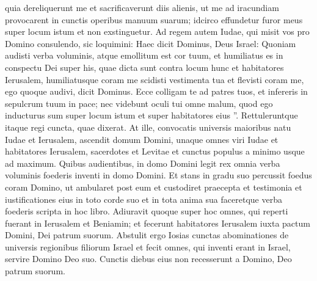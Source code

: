 \begin{biblechapter}
\begin{biblechapter}
\begin{biblechapter}
\begin{biblechapter}
\begin{biblechapter}
\begin{biblechapter}
\begin{biblechapter}
\begin{biblechapter}
\begin{biblechapter}
\begin{biblechapter}
\begin{biblechapter}
\begin{biblechapter}
\begin{biblechapter}
\begin{biblechapter}
\begin{biblechapter}
\begin{biblechapter}
\begin{biblechapter}
\begin{biblechapter}
\begin{biblechapter}
\begin{biblechapter}
\begin{biblechapter}
\begin{biblechapter}
\begin{biblechapter}
\begin{biblechapter}
\begin{biblechapter}
\begin{biblechapter}
\begin{biblechapter}
\begin{biblechapter}
\begin{biblechapter}
\begin{biblechapter}
\begin{biblechapter}
\begin{biblechapter}
\begin{biblechapter}
\begin{biblechapter}
\verse quia dereliquerunt me et sacrificaverunt diis alienis, ut me ad iracundiam provocarent in cunctis operibus manuum suarum; idcirco effundetur furor meus super locum istum et non exstinguetur. 
\verse Ad regem autem Iudae, qui misit vos pro Domino consulendo, sic loquimini: Haec dicit Dominus, Deus Israel: Quoniam audisti verba voluminis, 
\verse atque emollitum est cor tuum, et humiliatus es in conspectu Dei super his, quae dicta sunt contra locum hunc et habitatores Ierusalem, humiliatusque coram me scidisti vestimenta tua et flevisti coram me, ego quoque audivi, dicit Dominus. 
\verse Ecce colligam te ad patres tuos, et infereris in sepulcrum tuum in pace; nec videbunt oculi tui omne malum, quod ego inducturus sum super locum istum et super habitatores eius ”.
 Rettuleruntque itaque regi cuncta, quae dixerat.
 \verse At ille, convocatis universis maioribus natu Iudae et Ierusalem, 
\verse ascendit domum Domini, unaque omnes viri Iudae et habitatores Ierusalem, sacerdotes et Levitae et cunctus populus a minimo usque ad maximum. Quibus audientibus, in domo Domini legit rex omnia verba voluminis foederis inventi in domo Domini. 
\verse Et stans in gradu suo percussit foedus coram Domino, ut ambularet post eum et custodiret praecepta et testimonia et iustificationes eius in toto corde suo et in tota anima sua faceretque verba foederis scripta in hoc libro. 
\verse Adiuravit quoque super hoc omnes, qui reperti fuerant in Ierusalem et Beniamin; et fecerunt habitatores Ierusalem iuxta pactum Domini, Dei patrum suorum. 
\verse Abstulit ergo Iosias cunctas abominationes de universis regionibus filiorum Israel et fecit omnes, qui inventi erant in Israel, servire Domino Deo suo. Cunctis diebus eius non recesserunt a Domino, Deo patrum suorum.
 

\end{biblechapter}
\end{biblechapter}
\end{biblechapter}
\end{biblechapter}
\end{biblechapter}
\end{biblechapter}
\end{biblechapter}
\end{biblechapter}
\end{biblechapter}
\end{biblechapter}
\end{biblechapter}
\end{biblechapter}
\end{biblechapter}
\end{biblechapter}
\end{biblechapter}
\end{biblechapter}
\end{biblechapter}
\end{biblechapter}
\end{biblechapter}
\end{biblechapter}
\end{biblechapter}
\end{biblechapter}
\end{biblechapter}
\end{biblechapter}
\end{biblechapter}
\end{biblechapter}
\end{biblechapter}
\end{biblechapter}
\end{biblechapter}
\end{biblechapter}
\end{biblechapter}
\end{biblechapter}
\end{biblechapter}
\end{biblechapter}
